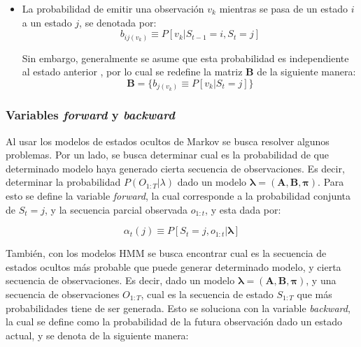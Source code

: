 \begin{itemize}
    \item La probabilidad de emitir una observación $v_{k}$ mientras se pasa de un estado $i$ a un estado $j$, se denotada por:
        \begin{equation}
            b_{ij(v_{k})} \equiv P \left[ v_{k} \vert S_{t-1} = i, S_{t} = j \right]
        \end{equation}

    Sin embargo, generalmente se asume que esta probabilidad es independiente al estado anterior \cite{Yu2016}, por lo cual se redefine la matriz \textbf{B} de la siguiente manera:
        \begin{equation}
            \textbf{B} = \lbrace b_{j(v_{k})} \equiv P\left[ v_{k} \vert S_{t} = j\right] \rbrace
        \end{equation}
  
\end{itemize}

\subsubsection{Variables \textit{forward} y \textit{backward}}

Al usar los modelos de estados ocultos de Markov se busca resolver algunos problemas. Por un lado, se busca determinar cual es la probabilidad de que determinado modelo haya generado cierta secuencia de observaciones. Es decir, determinar la probabilidad $P(O_{1:T} | \lambda)$ dado un modelo $\boldsymbol\lambda = ( \textbf{A} , \textbf{B} , \boldsymbol\pi )$. Para esto se define la variable \textit{forward}, la cual corresponde a la probabilidad conjunta de $S_{t}=j$, y la secuencia parcial observada $o_{1:t}$, y esta dada por:

    \begin{equation}
        \alpha_{t}(j) \equiv P \left[ S_{t} = j, o_{1:t} \vert \boldsymbol\lambda \right]
    \end{equation}
    
También, con los modelos HMM se busca encontrar cual es la secuencia de estados ocultos más probable que puede generar determinado modelo, y cierta secuencia de observaciones. Es decir, dado un modelo $\boldsymbol\lambda = ( \textbf{A} , \textbf{B} , \boldsymbol\pi )$, y una secuencia de observaciones $O_{1:T}$, cual es la secuencia de estado $S_{1:T}$ que más probabilidades tiene de ser generada. Esto se soluciona con la variable \textit{backward}, la cual se define como la probabilidad de la futura observación dado un estado actual, y se denota de la siguiente manera:

